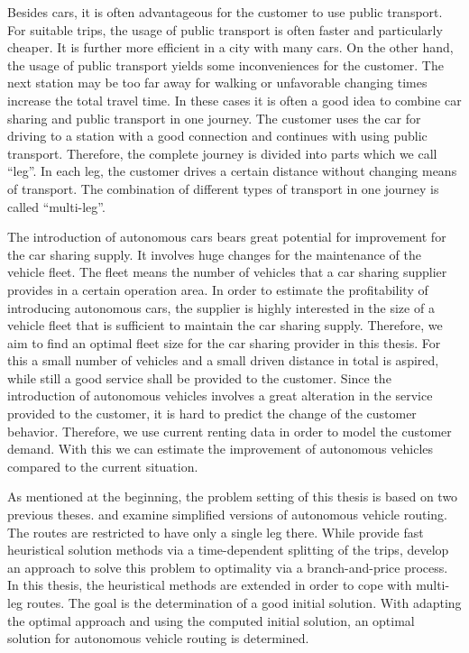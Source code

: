 Besides cars, it is often advantageous for the customer to use public transport. For suitable trips, the usage of public transport is often faster and particularly cheaper. It is further more efficient in a city with many cars. On the other hand, the usage of public transport yields some inconveniences for the customer. The next station may be too far away for walking or unfavorable changing times increase the total travel time. In these cases it is often a good idea to combine car sharing and public transport in one journey. The customer uses the car for driving to a station with a good connection and continues with using public transport. Therefore, the complete journey is divided into parts which we call \enquote{leg}. In each leg, the customer drives a certain distance without changing means of transport. The combination of different types of transport in one journey is called \enquote{multi-leg}.

The introduction of autonomous cars bears great potential for improvement for the car sharing supply. It involves huge changes for the maintenance of the vehicle fleet. The fleet means the number of vehicles that a car sharing supplier provides in a certain operation area. In order to estimate the profitability of introducing autonomous cars, the supplier is highly interested in the size of a vehicle fleet that is sufficient to maintain the car sharing supply. Therefore, we aim to find an optimal fleet size for the car sharing provider in this thesis. For this a small number of vehicles and a small driven distance in total is aspired, while still a good service shall be provided to the customer. Since the introduction of autonomous vehicles involves a great alteration in the service provided to the customer, it is hard to predict the change of the customer behavior. Therefore, we use current renting data in order to model the customer demand. With this we can estimate the improvement of autonomous vehicles compared to the current situation.

As mentioned at the beginning, the problem setting of this thesis is based on two previous theses. \cite{Kaiser} and \cite{Knoll} examine simplified versions of autonomous vehicle routing. The routes are restricted to have only a single leg there. While \cite{Knoll} provide fast heuristical solution methods via a time-dependent splitting of the trips, \cite{Kaiser} develop an approach to solve this problem to optimality via a branch-and-price process. In this thesis, the heuristical methods are extended in order to cope with multi-leg routes. The goal is the determination of a good initial solution. With adapting the optimal approach and using the computed initial solution, an optimal solution for autonomous vehicle routing is determined.